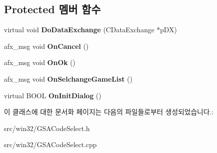 \subsection*{Protected 멤버 함수}
\begin{DoxyCompactItemize}
\item 
\mbox{\label{class_g_s_a_code_select_adae15096d0425900fee08d7bf710ac21}} 
virtual void {\bfseries Do\+Data\+Exchange} (C\+Data\+Exchange $\ast$p\+DX)
\item 
\mbox{\label{class_g_s_a_code_select_ab959eeacc114c26cdb5933e4e501164b}} 
afx\+\_\+msg void {\bfseries On\+Cancel} ()
\item 
\mbox{\label{class_g_s_a_code_select_a8d35a28174f3e4a5b42b7906741c4a63}} 
afx\+\_\+msg void {\bfseries On\+Ok} ()
\item 
\mbox{\label{class_g_s_a_code_select_a14529b62932e8eed3bc92f1a4d902b48}} 
afx\+\_\+msg void {\bfseries On\+Selchange\+Game\+List} ()
\item 
\mbox{\label{class_g_s_a_code_select_a8614bcbc03f8fc22303296416f66025f}} 
virtual B\+O\+OL {\bfseries On\+Init\+Dialog} ()
\end{DoxyCompactItemize}


이 클래스에 대한 문서화 페이지는 다음의 파일들로부터 생성되었습니다.\+:\begin{DoxyCompactItemize}
\item 
src/win32/G\+S\+A\+Code\+Select.\+h\item 
src/win32/G\+S\+A\+Code\+Select.\+cpp\end{DoxyCompactItemize}
